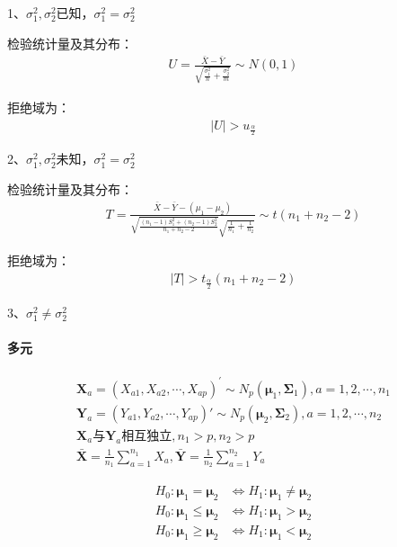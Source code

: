 \documentclass[12pt]{book}
\begin{document}
1、$\sigma_1^2,\sigma_2^2$已知，$\sigma_1^2=\sigma_2^2$

检验统计量及其分布：
\begin{gather*}
    U=\frac{\bar{X}-\bar{Y}}{\sqrt{\frac{\sigma_1^2}{n}+\frac{\sigma_2^2}{m}}}\sim N(0,1)
\end{gather*}


拒绝域为：
\begin{gather*}
    \left|U\right|>u_{\frac{\alpha}{2}}
\end{gather*}


2、$\sigma_1^2,\sigma_2^2$未知，$\sigma_1^2=\sigma_2^2$

检验统计量及其分布：
\begin{gather*}
    T=\frac{\bar{X}-\bar{Y}-(\mu_1-\mu_2)}{\sqrt{\frac{\left(n_1-1\right)S_1^2+\left(n_2-1\right)S_2^2}{n_1+n_2-2}}\sqrt{\frac{1}{n_1}+\frac{1}{n_2}}}\sim t(n_1+n_2-2)
\end{gather*}


拒绝域为：
\begin{gather*}
    \left|T\right|>t_{\frac{\alpha}{2}}(n_1+n_2-2)
\end{gather*}


3、$\sigma_1^2\neq\sigma_2^2$

\paragraph{多元}


\begin{gather*}
    \mathbf{X}_{a}=(X_{a1},X_{a2},\cdots,X_{ap})^\prime \sim N_p(\bm{\mu}_1,\bm{\Sigma}_1), a=1,2,\cdots,n_1\\
    \bm{Y}_a=\left(Y_{a1},Y_{a2},\cdots,Y_{ap}\right)' \sim N_p(\bm{\mu}_2,\mathbf{\Sigma}_2), a=1,2,\cdots,n_2 \\
    \mathbf{X}_{a}与\mathbf{Y}_a\text{相互独立}, n_1>p, n_2>p\\
    \bar{\bm{X}}=\frac{1}{n_1}\sum_{a=1}^{n_1}{X_a}, \bar{\bm{Y}}=\frac{1}{n_2}\sum_{a=1}^{n_2}{Y_a}
\end{gather*}



\begin{align*}
    H_0:\bm{\mu}_1=\bm{\mu}_2    & \Leftrightarrow H_1:\bm{\mu}_1\neq\bm{\mu}_2 \\
    H_0:\bm{\mu}_1\le\bm{\mu}_2  & \Leftrightarrow  H_1:\bm{\mu}_1>\bm{\mu}_2   \\
    H_0:\bm{\mu}_1\geq\bm{\mu}_2 & \Leftrightarrow H_1:\bm{\mu}_1<\bm{\mu}_2
\end{align*}
\end{document}
